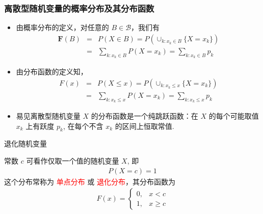 \begin{frame}
	\frametitle{离散型随机变量的概率分布及其分布函数}
	\begin{itemize}[<+-|alert@+>]
		\item 由概率分布的定义，对任意的 $B\in \mathcal{B}$，我们有
		      \begin{eqnarray*}
			      \mathbf{F}(B)&=&P(X\in B)=P(\cup_{k:x_k\in B}\{X=x_k\})\\
			      &=&\sum_{k:x_k\in B}P(X=x_k)=\sum_{k:x_k\in B}p_k
		      \end{eqnarray*}
		\item 由分布函数的定义知，
		      \begin{eqnarray*}
			      F(x)&=&P(X\le x)=P(\cup_{k:x_k\le x}\{X=x_k\})\\
			      &=&\sum_{k:x_k\le x}P(X=x_k)=\sum_{k:x_k\le x}p_k
		      \end{eqnarray*}
		\item 易见离散型随机变量 $X$ 的分布函数是一个纯跳跃函数：在 $X$ 的每个可能取值 $x_k$ 上有跃度 $p_k$, 在每个不含 $x_k$ 的区间上恒取常值.
	\end{itemize}

\end{frame}
\begin{frame}{退化随机变量}
	\begin{exam}
		常数 $c$ 可看作仅取一个值的随机变量 $X$, 即
		\begin{eqnarray*}
			P(X=c)=1
		\end{eqnarray*}
		这个分布常称为 \textcolor{red}{单点分布} 或 \textcolor{red}{退化分布}，其分布函数为
		\pause \begin{eqnarray*}
			F(x)=\left\{
			\begin{array}{ll}
				0, & x<c     \\
				1, & x\ge c
			\end{array}
			\right.
		\end{eqnarray*}
	\end{exam}

\end{frame}




